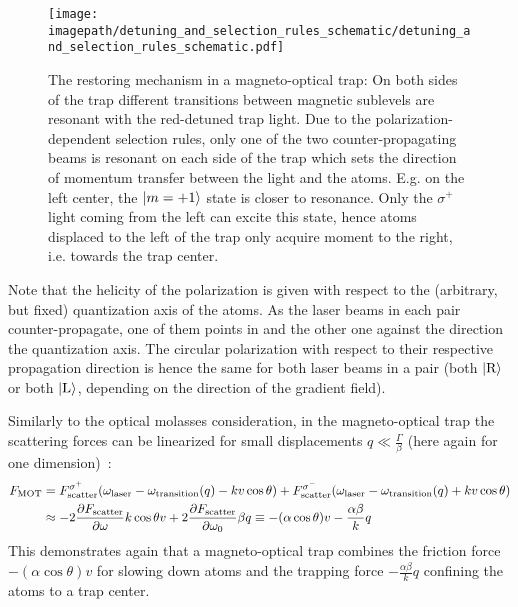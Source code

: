 \begin{figure}
    \centering
    \texttt{[image: \\imagepath/detuning\_and\_selection\_rules\_schematic/detuning\_and\_selection\_rules\_schematic.pdf]}
    \caption{The restoring mechanism in a magneto-optical trap: On both sides of the trap different transitions between magnetic sublevels are resonant with the red-detuned trap light. Due to the polarization-dependent selection rules, only one of the two counter-propagating beams is resonant on each side of the trap which sets the direction of momentum transfer between the light and the atoms. E.g. on the left center, the $\Ket{m = +1}$ state is closer to resonance. Only the $\sigma^+$ light coming from the left can excite this state, hence atoms displaced to the left of the trap only acquire moment to the right, i.e. towards the trap center.}
    \label{fig:detuning_and_selection_rules_schematic}
\end{figure}

Note that the helicity of the polarization is given with respect to the (arbitrary, but fixed) quantization axis of the atoms. As the laser beams in each pair counter-propagate, one of them points in and the other one against the direction the quantization axis. The circular polarization with respect to their respective propagation direction is hence the same for both laser beams in a pair (both $\Ket{\text{R}}$ or both $\Ket{\text{L}}$, depending on the direction of the gradient field).


Similarly to the optical molasses consideration, in the magneto-optical trap the scattering forces can be linearized for small displacements $q \ll \frac{\Gamma}{\beta}$ (here again for one dimension)~\cite{foot_atomic_2005}:
\begin{equation}\label{eq:mot_force}
    \begin{split}
        F_\text{MOT} &= F_\text{scatter}^{\sigma^+}(\omega_\text{laser} - \omega_\text{transition}(q) - kv \cos \theta) + F_\text{scatter}^{\sigma^-}(\omega_\text{laser} - \omega_\text{transition}(q) + kv \cos \theta)\\
        &\approx -2 \pdv{F_\text{scatter}}{\omega} k\cos \theta v + 2 \pdv{F_\text{scatter}}{\omega_0} \beta q  \equiv - (\alpha \cos \theta) v - \frac{\alpha \beta}{k} q
    \end{split}
\end{equation}
This demonstrates again that a magneto-optical trap combines the friction force $-(\alpha \cos \theta) v$ for slowing down atoms and the trapping force $- \frac{\alpha \beta}{k} q$ confining the atoms to a trap center.

